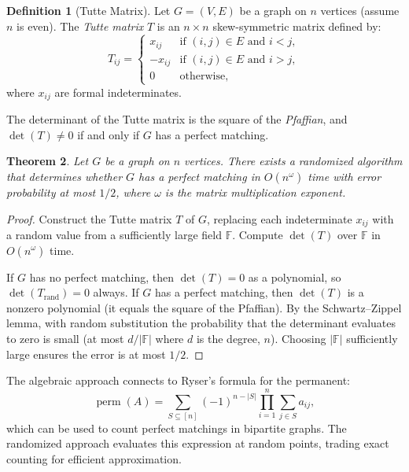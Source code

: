 \documentclass[twoside,12pt]{book}
\theoremstyle{plain}
\newtheorem{theorem}{Theorem}[chapter]
\theoremstyle{definition}
\newtheorem{definition}[theorem]{Definition}
\theoremstyle{remark}
\begin{document}
\begin{definition}[Tutte Matrix]
Let $G = (V, E)$ be a graph on $n$ vertices (assume $n$ is even). The \emph{Tutte matrix} $T$ is an $n \times n$ skew-symmetric matrix defined by:
\[
T_{ij} = \begin{cases}
x_{ij} & \text{if } (i,j) \in E \text{ and } i < j, \\
-x_{ij} & \text{if } (i,j) \in E \text{ and } i > j, \\
0 & \text{otherwise},
\end{cases}
\]
where $x_{ij}$ are formal indeterminates.
\end{definition}

The determinant of the Tutte matrix is the square of the \emph{Pfaffian}, and $\det(T) \neq 0$ if and only if $G$ has a perfect matching.

\begin{theorem}
\label{thm:perfect-matching}
Let $G$ be a graph on $n$ vertices. There exists a randomized algorithm that determines whether $G$ has a perfect matching in $O(n^\omega)$ time with error probability at most $1/2$, where $\omega$ is the matrix multiplication exponent.
\end{theorem}

\begin{proof}
Construct the Tutte matrix $T$ of $G$, replacing each indeterminate $x_{ij}$ with a random value from a sufficiently large field $\mathbb{F}$. Compute $\det(T)$ over $\mathbb{F}$ in $O(n^\omega)$ time.

If $G$ has no perfect matching, then $\det(T) = 0$ as a polynomial, so $\det(T_{\text{rand}}) = 0$ always. If $G$ has a perfect matching, then $\det(T)$ is a nonzero polynomial (it equals the square of the Pfaffian). By the Schwartz--Zippel lemma, with random substitution the probability that the determinant evaluates to zero is small (at most $d/|\mathbb{F}|$ where $d$ is the degree, $n$). Choosing $|\mathbb{F}|$ sufficiently large ensures the error is at most $1/2$.
\end{proof}

The algebraic approach connects to Ryser's formula for the permanent:
\[
\operatorname{perm}(A) = \sum_{S \subseteq [n]} (-1)^{n - |S|} \prod_{i=1}^{n} \sum_{j \in S} a_{ij},
\]
which can be used to count perfect matchings in bipartite graphs. The randomized approach evaluates this expression at random points, trading exact counting for efficient approximation.


\end{document}
